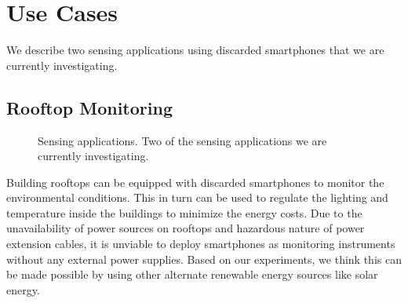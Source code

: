 \section{Use Cases}
\label{sec-usecases}
We describe two sensing applications using discarded smartphones that we are
currently investigating.
\subsection{Rooftop Monitoring}
\begin{figure}[t]
  \centering
  \quad


  \vspace*{-0.1in}

  \caption{\small Sensing applications.
  \textnormal{Two of the sensing applications we are currently investigating.}}

  \vspace*{-0.1in}

\end{figure}
Building rooftops can be equipped with discarded smartphones to monitor the
environmental conditions. This in turn can be used to regulate the lighting and
temperature inside the buildings to minimize the energy costs.
Due to the unavailability of power sources on rooftops and hazardous nature of
power extension cables, it is unviable to deploy smartphones as monitoring
instruments without any external power supplies.
Based on our experiments, we think this can be made possible by using other
alternate renewable energy sources like solar energy.

